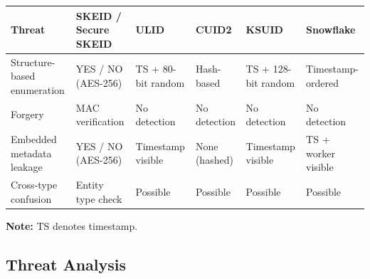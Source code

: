 \documentclass[a4paper,fleqn]{cas-sc}
\newcounter{none}
\begin{document}
{\def\LTcaptype{none} %
\begin{longtable}[]{@{}
  >{\raggedright\arraybackslash}p{}
  >{\raggedright\arraybackslash}p{}
  >{\raggedright\arraybackslash}p{}
  >{\raggedright\arraybackslash}p{}
  >{\raggedright\arraybackslash}p{}
  >{\raggedright\arraybackslash}p{}@{}}
\toprule\noalign{}
\begin{minipage}[b]{\linewidth}\raggedright
Threat
\end{minipage} & \begin{minipage}[b]{\linewidth}\raggedright
SKEID / Secure SKEID
\end{minipage} & \begin{minipage}[b]{\linewidth}\raggedright
ULID
\end{minipage} & \begin{minipage}[b]{\linewidth}\raggedright
CUID2
\end{minipage} & \begin{minipage}[b]{\linewidth}\raggedright
KSUID
\end{minipage} & \begin{minipage}[b]{\linewidth}\raggedright
Snowflake
\end{minipage} \\
\midrule\noalign{}
\endhead
\bottomrule\noalign{}
\endlastfoot
Structure-based enumeration & YES / NO (AES-256) & TS + 80-bit random &
Hash-based & TS + 128-bit random & Timestamp-ordered \\
Forgery & MAC verification & No detection & No detection & No detection
& No detection \\
Embedded metadata leakage & YES / NO (AES-256) & Timestamp visible &
None (hashed) & Timestamp visible & TS + worker visible \\
Cross-type confusion & Entity type check & Possible & Possible &
Possible & Possible \\
\end{longtable}
}

\textbf{Note:} TS denotes timestamp.

\subsection{Threat Analysis}\label{threat-analysis}
\end{document}
